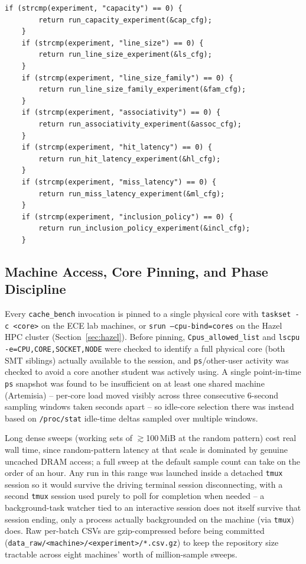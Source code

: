 \documentclass{article}
\begin{document}
\begin{lstlisting}[caption={\texttt{cache\_bench} experiment dispatch, excerpted. File: \texttt{main\_code/common/main.c} (lines 475--503), commit \texttt{7be6dac}.},label={lst:maindispatch}]
    if (strcmp(experiment, "capacity") == 0) {
        return run_capacity_experiment(&cap_cfg);
    }
    if (strcmp(experiment, "line_size") == 0) {
        return run_line_size_experiment(&ls_cfg);
    }
    if (strcmp(experiment, "line_size_family") == 0) {
        return run_line_size_family_experiment(&fam_cfg);
    }
    if (strcmp(experiment, "associativity") == 0) {
        return run_associativity_experiment(&assoc_cfg);
    }
    if (strcmp(experiment, "hit_latency") == 0) {
        return run_hit_latency_experiment(&hl_cfg);
    }
    if (strcmp(experiment, "miss_latency") == 0) {
        return run_miss_latency_experiment(&ml_cfg);
    }
    if (strcmp(experiment, "inclusion_policy") == 0) {
        return run_inclusion_policy_experiment(&incl_cfg);
    }
\end{lstlisting}

\subsection{Machine Access, Core Pinning, and Phase Discipline}
\label{sec:phasediscipline}

Every \texttt{cache\_bench} invocation is pinned to a single physical core with
\texttt{taskset -c <core>} on the ECE lab machines, or \texttt{srun --cpu-bind=cores} on
the Hazel HPC cluster (Section~\ref{sec:hazel}). Before pinning, \texttt{Cpus\_allowed\_list}
and \texttt{lscpu -e=CPU,CORE,SOCKET,NODE} were checked to identify a full physical core
(both SMT siblings) actually available to the session, and \texttt{ps}/other-user activity
was checked to avoid a core another student was actively using. A single point-in-time
\texttt{ps} snapshot was found to be insufficient on at least one shared machine (Artemisia)
-- per-core load moved visibly across three consecutive 6-second sampling windows taken
seconds apart -- so idle-core selection there was instead based on \texttt{/proc/stat}
idle-time deltas sampled over multiple windows.

Long dense sweeps (working sets of $\gtrsim$100\,MiB at the random pattern) cost real wall
time, since random-pattern latency at that scale is dominated by genuine uncached DRAM
access; a full sweep at the default sample count can take on the order of an hour. Any run
in this range was launched inside a detached \texttt{tmux} session so it would survive the
driving terminal session disconnecting, with a second \texttt{tmux} session used purely to
poll for completion when needed -- a background-task watcher tied to an interactive session
does not itself survive that session ending, only a process actually backgrounded on the
machine (via \texttt{tmux}) does. Raw per-batch CSVs are gzip-compressed before being
committed (\texttt{data\_raw/<machine>/<experiment>/*.csv.gz}) to keep the repository size
tractable across eight machines' worth of million-sample sweeps.
\end{document}
